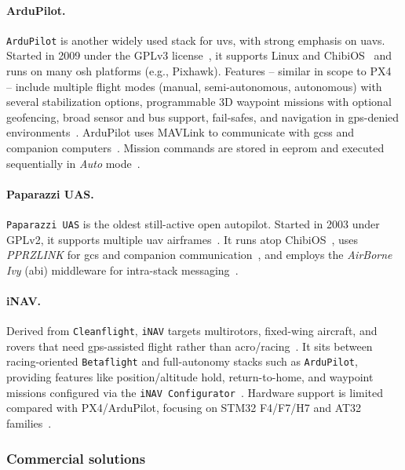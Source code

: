 \paragraph{ArduPilot.}
\lstinline|ArduPilot| is another widely used stack for \glspl{uv}, with strong emphasis on \glspl{uav}. 
Started in 2009 under the GPLv3 license~\cite{arduPilotHistory}, it supports Linux and ChibiOS~\cite{arduPilot-github,jargalsaikhan2022architectural} and runs on many \gls{osh} platforms (e.g., Pixhawk). 
Features -- similar in scope to PX4~\cite{px4-features} -- include multiple flight modes (manual, semi-autonomous, autonomous) with several stabilization options, programmable 3D waypoint missions with optional geofencing, broad sensor and bus support, fail-safes, and navigation in \gls{gps}-denied environments~\cite{arduPilot-home}. 
ArduPilot uses MAVLink to communicate with \glspl{gcs} and companion computers~\cite{arduPilot-home}. 
Mission commands are stored in \gls{eeprom} and executed sequentially in \emph{Auto} mode~\cite{ardupilot-mavlink}.

\paragraph{Paparazzi UAS.}
\lstinline|Paparazzi UAS| is the oldest still-active open autopilot. 
Started in 2003 under GPLv2, it supports multiple \gls{uav}
airframes~\cite{paparazzi-home}.
It runs atop ChibiOS~\cite{paparazzi-sysOverv}, uses \emph{PPRZLINK} for
\gls{gcs} and companion communication~\cite{paparazzi-sysOverv}, and employs the
\emph{AirBorne Ivy} (\gls{abi}) middleware for intra-stack
messaging~\cite{jargalsaikhan2022architectural}.

\paragraph{iNAV.}
Derived from \lstinline|Cleanflight|, \lstinline|iNAV| targets multirotors,
fixed-wing aircraft, and rovers that need \gls{gps}-assisted flight rather than
acro/racing~\cite{inav-github}.
It sits between racing-oriented \lstinline|Betaflight| and full-autonomy stacks
such as \lstinline|ArduPilot|, providing features like position/altitude hold,
return-to-home, and waypoint missions configured via the
\lstinline|iNAV Configurator|~\cite{inav-github}.
Hardware support is limited compared with PX4/ArduPilot, focusing on STM32
F4/F7/H7 and AT32 families~\cite{inav-github}.

\subsubsection{Commercial solutions}%
\label{sec:commercial-solutions-sw}

